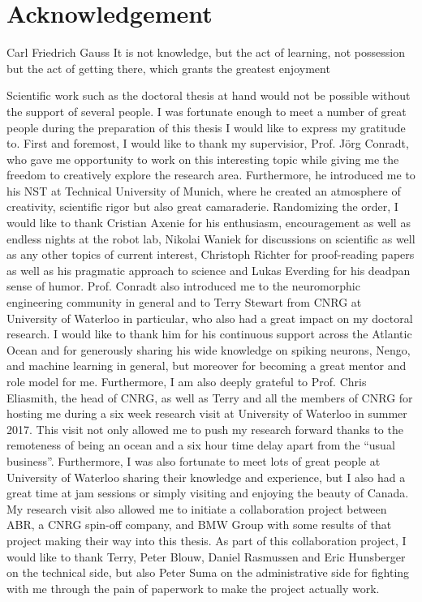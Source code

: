 \chapter*{Acknowledgement}
\begin{chapquote}{Carl Friedrich Gauss}
It is not knowledge, but the act of learning, not possession but the act of getting there, which grants the greatest enjoyment
\end{chapquote}

Scientific work such as the doctoral thesis at hand would not be possible without the support of several people.
I was fortunate enough to meet a number of great people during the preparation of this thesis I would like to express my gratitude to.
First and foremost, I would like to thank my supervisior, Prof. J\"org Conradt, who gave me opportunity to work on this interesting topic while giving me the freedom to creatively explore the research area.
Furthermore, he introduced me to his \acl{NST} at Technical University of Munich, where he created an atmosphere of creativity, scientific rigor but also great camaraderie.
Randomizing the order, I would like to thank Cristian Axenie for his enthusiasm, encouragement as well as endless nights at the robot lab, Nikolai Waniek for discussions on scientific as well as any other topics of current interest, Christoph Richter for proof-reading papers as well as his pragmatic approach to science and Lukas Everding for his deadpan sense of humor.
Prof. Conradt also introduced me to the neuromorphic engineering community in general and to Terry Stewart from \ac{CNRG} at University of Waterloo in particular, who also had a great impact on my doctoral research.
I would like to thank him for his continuous support across the Atlantic Ocean and for generously sharing his wide knowledge on spiking neurons, Nengo, and machine learning in general, but moreover for becoming a great mentor and role model for me.
Furthermore, I am also deeply grateful to Prof. Chris Eliasmith, the head of \ac{CNRG}, as well as Terry and all the members of \ac{CNRG} for hosting me during a six week research visit at University of Waterloo in summer 2017.
This visit not only allowed me to push my research forward thanks to the remoteness of being an ocean and a six hour time delay apart from the \enquote{usual business}.
Furthermore, I was also fortunate to meet lots of great people at University of Waterloo sharing their knowledge and experience, but I also had a great time at jam sessions or simply visiting and enjoying the beauty of Canada.
My research visit also allowed me to initiate a collaboration project between \ac{ABR}, a \ac{CNRG} spin-off company, and BMW Group with some results of that project making their way into this thesis.
As part of this collaboration project, I would like to thank Terry, Peter Blouw, Daniel Rasmussen and Eric Hunsberger on the technical side, but also Peter Suma on the administrative side for fighting with me through the pain of paperwork to make the project actually work.

